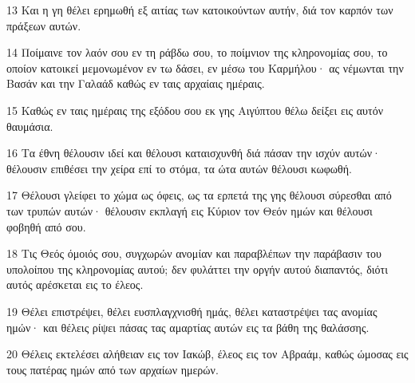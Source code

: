 \par 13 Και η γη θέλει ερημωθή εξ αιτίας των κατοικούντων αυτήν, διά τον καρπόν των πράξεων αυτών.
\par 14 Ποίμαινε τον λαόν σου εν τη ράβδω σου, το ποίμνιον της κληρονομίας σου, το οποίον κατοικεί μεμονωμένον εν τω δάσει, εν μέσω του Καρμήλου· ας νέμωνται την Βασάν και την Γαλαάδ καθώς εν ταις αρχαίαις ημέραις.
\par 15 Καθώς εν ταις ημέραις της εξόδου σου εκ γης Αιγύπτου θέλω δείξει εις αυτόν θαυμάσια.
\par 16 Τα έθνη θέλουσιν ιδεί και θέλουσι καταισχυνθή διά πάσαν την ισχύν αυτών· θέλουσιν επιθέσει την χείρα επί το στόμα, τα ώτα αυτών θέλουσι κωφωθή.
\par 17 Θέλουσι γλείφει το χώμα ως όφεις, ως τα ερπετά της γης θέλουσι σύρεσθαι από των τρυπών αυτών· θέλουσιν εκπλαγή εις Κύριον τον Θεόν ημών και θέλουσι φοβηθή από σου.
\par 18 Τις Θεός όμοιός σου, συγχωρών ανομίαν και παραβλέπων την παράβασιν του υπολοίπου της κληρονομίας αυτού; δεν φυλάττει την οργήν αυτού διαπαντός, διότι αυτός αρέσκεται εις το έλεος.
\par 19 Θέλει επιστρέψει, θέλει ευσπλαγχνισθή ημάς, θέλει καταστρέψει τας ανομίας ημών· και θέλεις ρίψει πάσας τας αμαρτίας αυτών εις τα βάθη της θαλάσσης.
\par 20 Θέλεις εκτελέσει αλήθειαν εις τον Ιακώβ, έλεος εις τον Αβραάμ, καθώς ώμοσας εις τους πατέρας ημών από των αρχαίων ημερών.


